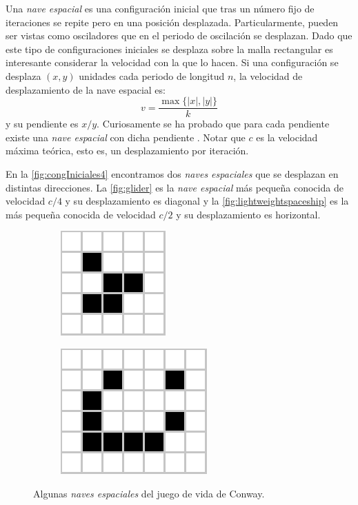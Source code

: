 \documentclass[../proyecto.tex]{memoir}
\begin{document}
Una \textit{nave espacial} es una configuración inicial que tras un número fijo de iteraciones se repite pero en una posición desplazada. Particularmente, pueden ser vistas como osciladores que en el periodo de oscilación se desplazan. Dado que este tipo de configuraciones iniciales se desplaza sobre la malla rectangular es interesante considerar la velocidad con la que lo hacen. Si una configuración se desplaza $(x, y)$ unidades cada periodo de longitud $n$, la velocidad de desplazamiento de la nave espacial es: $$
 v = \frac{\max\{|x|,|y|\}}{k}
$$ 
y su pendiente es $x/y$. Curiosamente se ha probado que para cada pendiente existe una \textit{nave espacial} con dicha pendiente \cite{pendienteNaves}. Notar que $c$ es la velocidad máxima teórica, esto es, un desplazamiento por iteración.

En la \autoref{fig:congIniciales4} encontramos dos \textit{naves espaciales} que se desplazan en distintas direcciones. La \autoref{fig:glider} es la \textit{nave espacial} más pequeña conocida de velocidad $c/4$ y su desplazamiento es diagonal y la \autoref{fig:lightweightspaceship} es la más pequeña conocida de velocidad $c/2$ y su desplazamiento es horizontal.

\begin{figure}[H]
	\centering
	\begin{subfigure}[b]{0.3\linewidth} 
        \centering
        \includegraphics[height=.35\linewidth]{./images/glider.png}
        \caption{}
        \label{fig:glider}
    \end{subfigure}
    \quad
	\begin{subfigure}[b]{0.3\linewidth} 
        \centering
        \includegraphics[height=0.45\linewidth]{./images/lightweightspaceship.png}
        \caption{}
        \label{fig:lightweightspaceship}
    \end{subfigure}
	\caption{Algunas \textit{naves espaciales} del juego de vida de Conway.}
	\label{fig:congIniciales4}
\end{figure} 
\end{document}
